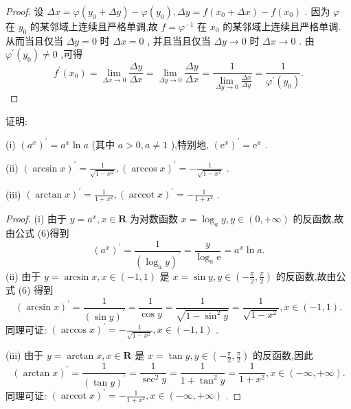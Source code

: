 \begin{proof}
设 \({\Delta x} = \varphi \left( {{y}_{0} + {\Delta y}}\right)  - \varphi \left( {y}_{0}\right) ,{\Delta y} = f\left( {{x}_{0} + {\Delta x}}\right)  - f\left( {x}_{0}\right)\) . 因为 \(\varphi\) 在 \({y}_{0}\) 的某邻域上连续且严格单调,故 \(f = {\varphi }^{-1}\) 在 \({x}_{0}\) 的某邻域上连续且严格单调. 从而当且仅当 \({\Delta y} = 0\) 时 \({\Delta x} = 0\) , 并且当且仅当 \({\Delta y} \rightarrow  0\) 时 \({\Delta x} \rightarrow  0\) . 由 \({\varphi }^{\prime }\left( {y}_{0}\right)  \neq  0\) ,可得
\[
{f}^{\prime }\left( {x}_{0}\right)  = \mathop{\lim }\limits_{{{\Delta x} \rightarrow  0}}\frac{\Delta y}{\Delta x} = \mathop{\lim }\limits_{{{\Delta y} \rightarrow  0}}\frac{\Delta y}{\Delta x} = \frac{1}{\mathop{\lim }\limits_{{{\Delta y} \rightarrow  0}}\frac{\Delta x}{\Delta y}} = \frac{1}{{\varphi }^{\prime }\left( {y}_{0}\right) }.
\]
\end{proof}

\begin{example}
证明:

(i) \({\left( {a}^{x}\right) }^{\prime } = {a}^{x}\ln a\) (其中 \(a > 0,a \neq  1\) ),特别地, \({\left( {\mathrm{e}}^{x}\right) }^{\prime } = {\mathrm{e}}^{x}\) .

(ii) \({\left( \arcsin x\right) }^{\prime } = \frac{1}{\sqrt{1 - {x}^{2}}},{\left( \arccos x\right) }^{\prime } =  - \frac{1}{\sqrt{1 - {x}^{2}}}\) .

(iii) \({\left( \arctan x\right) }^{\prime } = \frac{1}{1 + {x}^{2}},{\left( \operatorname{arccot}x\right) }^{\prime } =  - \frac{1}{1 + {x}^{2}}\) .
\end{example}


\begin{proof}
(i) 由于 \(y = {a}^{x},x \in  \mathbf{R}\) 为对数函数 \(x = {\log }_{a}y,y \in  \left( {0, + \infty }\right)\) 的反函数,故由公式 (6)得到
\[
{\left( {a}^{x}\right) }^{\prime } = \frac{1}{{\left( {\log }_{a}y\right) }^{\prime }} = \frac{y}{{\log }_{a}\mathrm{e}} = {a}^{x}\ln a.
\]
(ii) 由于 \(y = \arcsin x,x \in  \left( {-1,1}\right)\) 是 \(x = \sin y,y \in  \left( {-\frac{\pi }{2},\frac{\pi }{2}}\right)\) 的反函数,故由公式 (6) 得到
\[
{\left( \arcsin x\right) }^{\prime } = \frac{1}{{\left( \sin y\right) }^{\prime }} = \frac{1}{\cos y} = \frac{1}{\sqrt{1 - {\sin }^{2}y}} = \frac{1}{\sqrt{1 - {x}^{2}}},x \in  \left( {-1,1}\right) .
\]
同理可证: \({\left( \arccos x\right) }^{\prime } =  - \frac{1}{\sqrt{1 - {x}^{2}}},x \in  \left( {-1,1}\right)\) .

(iii) 由于 \(y = \arctan x,x \in  \mathbf{R}\) 是 \(x = \tan y,y \in  \left( {-\frac{\pi }{2},\frac{\pi }{2}}\right)\) 的反函数,因此
\[
{\left( \arctan x\right) }^{\prime } = \frac{1}{{\left( \tan y\right) }^{\prime }} = \frac{1}{{\sec }^{2}y} = \frac{1}{1 + {\tan }^{2}y} = \frac{1}{1 + {x}^{2}},x \in  \left( {-\infty , + \infty }\right) .
\]
同理可证: \({\left( \operatorname{arccot}x\right) }^{\prime } =  - \frac{1}{1 + {x}^{2}},x \in  \left( {-\infty , + \infty }\right)\) .
\end{proof}


